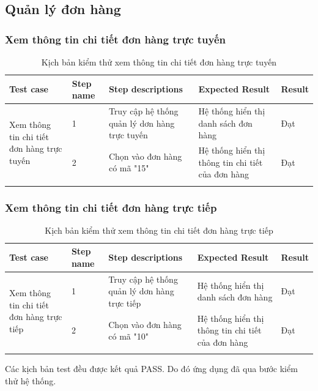 \subsection{Quản lý đơn hàng}
\subsubsection{ Xem thông tin chi tiết đơn hàng trực tuyến}
{
    \setlength\extrarowheight{6pt}
    \begin{longtable}{| p{2.5cm}| p{1cm}| p{5.5cm}| p{4.5cm} | p{1.5cm} |}
        \hline
        \textbf{Test case}                                                  & \textbf{Step name} & \textbf{Step descriptions}                    & \textbf{Expected Result}                          & \textbf{Result} \\
        \hline
        \multirow[t]{2}{2.5cm}{ Xem thông tin chi tiết đơn hàng trực tuyến} & 1                  & Truy cập hệ thống quản lý dơn hàng trực tuyến & Hệ thống hiển thị danh sách đơn hàng              & Đạt             \\
        \cline{2-5}
                                                                            & 2                  & Chọn vào đơn hàng có mã "15"                  & Hệ thống hiển thị thông tin chi tiết của đơn hàng & Đạt             \\
        \hline
        \caption{Kịch bản kiểm thử xem thông tin chi tiết đơn hàng trực tuyến}
    \end{longtable}
}

\subsubsection{ Xem thông tin chi tiết đơn hàng trực tiếp}
{
    \setlength\extrarowheight{6pt}
    \begin{longtable}{| p{2.5cm}| p{1cm}| p{5.5cm}| p{4.5cm} | p{1.5cm} |}
        \hline
        \textbf{Test case}                                                 & \textbf{Step name} & \textbf{Step descriptions}                   & \textbf{Expected Result}                          & \textbf{Result} \\
        \hline
        \multirow[t]{2}{2.5cm}{ Xem thông tin chi tiết đơn hàng trực tiếp} & 1                  & Truy cập hệ thống quản lý dơn hàng trực tiếp & Hệ thống hiển thị danh sách đơn hàng              & Đạt             \\
        \cline{2-5}
                                                                           & 2                  & Chọn vào đơn hàng có mã "10"                 & Hệ thống hiển thị thông tin chi tiết của đơn hàng & Đạt             \\
        \hline
        \caption{Kịch bản kiểm thử xem thông tin chi tiết đơn hàng trực tiếp}
    \end{longtable}
}
Các kịch bản test đều được kết quả PASS. Do đó ứng dụng đã qua bước kiểm thử hệ thống.